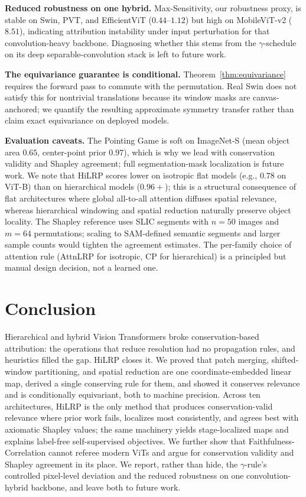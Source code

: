 \documentclass[lettersize,journal]{IEEEtran}
\begin{document}
\textbf{Reduced robustness on one hybrid.} Max-Sensitivity, our robustness proxy, is stable on Swin, PVT, and EfficientViT ($0.44$--$1.12$) but high on MobileViT-v2 ($8.51$), indicating attribution instability under input perturbation for that convolution-heavy backbone. Diagnosing whether this stems from the $\gamma$-schedule on its deep separable-convolution stack is left to future work.

\textbf{The equivariance guarantee is conditional.} Theorem~\ref{thm:equivariance} requires the forward pass to commute with the permutation. Real Swin does not satisfy this for nontrivial translations because its window masks are canvas-anchored; we quantify the resulting approximate symmetry transfer rather than claim exact equivariance on deployed models.

\textbf{Evaluation caveats.} The Pointing Game is soft on ImageNet-S (mean object area $0.65$, center-point prior $0.97$), which is why we lead with conservation validity and Shapley agreement; full segmentation-mask localization is future work. We note that HiLRP scores lower on isotropic flat models (e.g., $0.78$ on ViT-B) than on hierarchical models ($0.96+$); this is a structural consequence of flat architectures where global all-to-all attention diffuses spatial relevance, whereas hierarchical windowing and spatial reduction naturally preserve object locality. The Shapley reference uses SLIC segments with $n{=}50$ images and $m{=}64$ permutations; scaling to SAM-defined semantic segments and larger sample counts would tighten the agreement estimates. The per-family choice of attention rule (AttnLRP for isotropic, CP for hierarchical) is a principled but manual design decision, not a learned one.

\section{Conclusion}
\label{sec:conclusion}
Hierarchical and hybrid Vision Transformers broke conservation-based attribution: the operations that reduce resolution had no propagation rules, and heuristics filled the gap. HiLRP closes it. We proved that patch merging, shifted-window partitioning, and spatial reduction are one coordinate-embedded linear map, derived a single conserving rule for them, and showed it conserves relevance and is conditionally equivariant, both to machine precision. Across ten architectures, HiLRP is the only method that produces conservation-valid relevance where prior work fails, localizes most consistently, and agrees best with axiomatic Shapley values; the same machinery yields stage-localized maps and explains label-free self-supervised objectives. We further show that Faithfulness-Correlation cannot referee modern ViTs and argue for conservation validity and Shapley agreement in its place. We report, rather than hide, the $\gamma$-rule's controlled pixel-level deviation and the reduced robustness on one convolution-hybrid backbone, and leave both to future work.




\vfill
\end{document}
